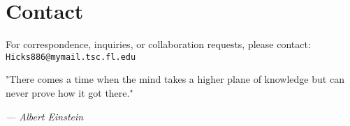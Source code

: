 \documentclass[12pt]{article}
\begin{document}
\section*{Contact}
For correspondence, inquiries, or collaboration requests, please contact:
\texttt{Hicks886@mymail.tsc.fl.edu}

\vspace{2em}
\begin{center}
\epigraph{"There comes a time when the mind takes a higher plane of knowledge but can never prove how it got there."}{\textit{— Albert Einstein}}
\end{center}
\end{document}
